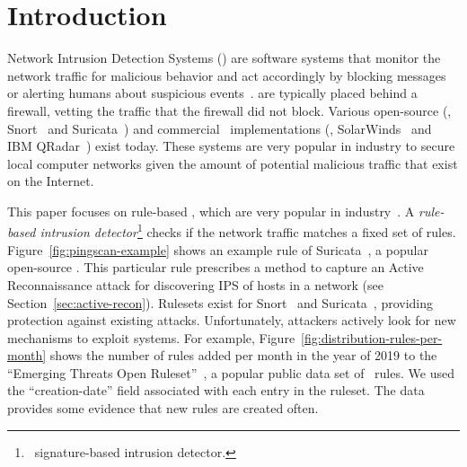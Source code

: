 \documentclass[sigconf,review, anonymous]{acmart}
\begin{document}




\maketitle

\section{Introduction}
\label{sec:intro}

Network Intrusion Detection Systems (\nids{}) are software systems
that monitor the network traffic for malicious behavior and act
accordingly by blocking messages or alerting humans about suspicious
events~\cite{Mitchell:2014:SID:2597757.2542049}. \nids{} are typically
placed behind a firewall, vetting the traffic that the firewall did
not block. Various open-source (\eg{}, Snort~\cite{snort} and
Suricata~\cite{suricata}) and commercial \nids\ implementations (\eg{},
SolarWinds~\cite{solarwinds} and IBM QRadar~\cite{qradar}) exist
today. These systems are very popular in industry to secure local
computer networks given the amount of potential malicious traffic that
exist on the Internet.

This paper focuses on rule-based \nids{}, which are very popular in
industry~\cite{proofpoint-etpro,snort-rule-subscriptions}. A
\emph{rule-based intrusion detector}\footnote{\aka\ signature-based
  intrusion detector.} checks if the network traffic matches a fixed
set of rules. Figure~\ref{fig:pingscan-example} shows an example rule
of Suricata~\cite{suricata}, a popular open-source \nids{}. This
particular rule prescribes a method to capture an Active
Reconnaissance attack for discovering IPS of hosts in a network (see
Section~\ref{sec:active-recon}). Rulesets exist for Snort~\cite{snort}
and Suricata~\cite{suricata}, providing protection against existing
attacks. Unfortunately, attackers actively look for new mechanisms to
exploit systems. For example,
Figure~\ref{fig:distribution-rules-per-month} shows the number of
rules added per month in the year of 2019 to the ``Emerging Threats
Open Ruleset''~\cite{emerging-threats-open}, a popular public data set
of \suri\ rules. We used the ``creation-date'' field associated with
each entry in the ruleset. The data provides some evidence that new
rules are created often.
\end{document}
